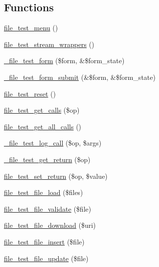 \subsection*{Functions}
\begin{DoxyCompactItemize}
\item 
\hyperlink{file__test_8module_ad70b9163a9b65cb4aecdd0e82a964925}{file\_\-test\_\-menu} ()
\item 
\hyperlink{file__test_8module_a76102017424892a480ae784238ca1c6d}{file\_\-test\_\-stream\_\-wrappers} ()
\item 
\hyperlink{file__test_8module_a655f98b0e48e5f05b6bd0d7171bd7388}{\_\-file\_\-test\_\-form} (\$form, \&\$form\_\-state)
\item 
\hyperlink{file__test_8module_a9b7757f4f5643b488de8a846328c991d}{\_\-file\_\-test\_\-form\_\-submit} (\&\$form, \&\$form\_\-state)
\item 
\hyperlink{file__test_8module_ac3231cdae85b5f6631a201a2f56e9d84}{file\_\-test\_\-reset} ()
\item 
\hyperlink{file__test_8module_a43842b551a9a076a33290c02b9c567b0}{file\_\-test\_\-get\_\-calls} (\$op)
\item 
\hyperlink{file__test_8module_a0905605238cea95f9ed131fcf0c7ed2e}{file\_\-test\_\-get\_\-all\_\-calls} ()
\item 
\hyperlink{file__test_8module_a102b88df111a0197411b9b651e0ef7d5}{\_\-file\_\-test\_\-log\_\-call} (\$op, \$args)
\item 
\hyperlink{file__test_8module_a7102eea8d64b4742d521968ca7653bdd}{\_\-file\_\-test\_\-get\_\-return} (\$op)
\item 
\hyperlink{file__test_8module_a5af89506d8703c84616e6595bc088a7f}{file\_\-test\_\-set\_\-return} (\$op, \$value)
\item 
\hyperlink{file__test_8module_a31927dacc1e6dd41f9e0bceba1beffe8}{file\_\-test\_\-file\_\-load} (\$files)
\item 
\hyperlink{file__test_8module_a19d202e5144e3c74153486c1e789e6c7}{file\_\-test\_\-file\_\-validate} (\$file)
\item 
\hyperlink{file__test_8module_a4692e5cdf927263bb8957f7f23218114}{file\_\-test\_\-file\_\-download} (\$uri)
\item 
\hyperlink{file__test_8module_a59a51b53083d4fd3a629c35e18cea73b}{file\_\-test\_\-file\_\-insert} (\$file)
\item 
\hyperlink{file__test_8module_aec3d536bef294fb196d59259eee975b3}{file\_\-test\_\-file\_\-update} (\$file)
\item 

\end{DoxyCompactItemize}
